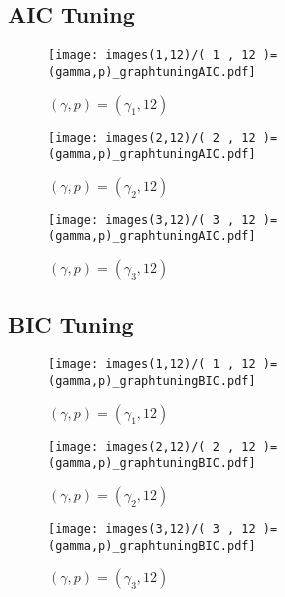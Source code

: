 \documentclass[main.tex]{subfiles}
\begin{document}



\subsection{AIC Tuning}
\begin{figure}[H]
    \centering
    \texttt{[image: images(1,12)/( 1 , 12 )=(gamma,p)\_graphtuningAIC.pdf]}
    \caption{$(\gamma, p) = (\gamma_1, 12)$}
    \label{fig:AIC1-12}
\end{figure}
\begin{figure}[H]
    \centering
    \texttt{[image: images(2,12)/( 2 , 12 )=(gamma,p)\_graphtuningAIC.pdf]}
    \caption{$(\gamma, p) = (\gamma_2, 12)$}
    \label{fig:AIC2-12}
\end{figure}
\begin{figure}[H]
    \centering
    \texttt{[image: images(3,12)/( 3 , 12 )=(gamma,p)\_graphtuningAIC.pdf]}
    \caption{$(\gamma, p) = (\gamma_3, 12)$}
    \label{fig:AIC3-12}
\end{figure}



\subsection{BIC Tuning}
\begin{figure}[H]
    \centering
    \texttt{[image: images(1,12)/( 1 , 12 )=(gamma,p)\_graphtuningBIC.pdf]}
    \caption{$(\gamma, p) = (\gamma_1, 12)$}
    \label{fig:BIC1-12}
\end{figure}
\begin{figure}[H]
    \centering
    \texttt{[image: images(2,12)/( 2 , 12 )=(gamma,p)\_graphtuningBIC.pdf]}
    \caption{$(\gamma, p) = (\gamma_2, 12)$}
    \label{fig:BIC2-12}
\end{figure}
\begin{figure}[H]
    \centering
    \texttt{[image: images(3,12)/( 3 , 12 )=(gamma,p)\_graphtuningBIC.pdf]}
    \caption{$(\gamma, p) = (\gamma_3, 12)$}
    \label{fig:BIC3-12}
\end{figure}
\end{document}
